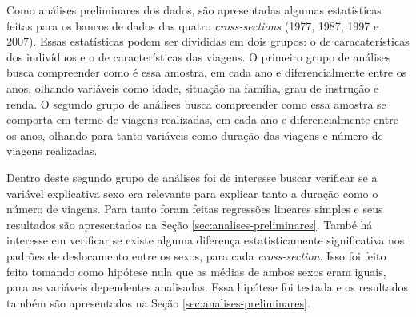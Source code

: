 \begin{quadro}[htb]
\end{quadro}

Como análises preliminares dos dados, são apresentadas algumas estatísticas feitas para os bancos de dados das quatro \emph{cross-sections} (1977, 1987, 1997 e 2007). Essas estatísticas podem ser divididas em dois grupos: o de caracaterísticas dos indivíduos e o de características das viagens. O primeiro grupo de análises busca compreender como é essa amostra, em cada ano e diferencialmente entre os anos, olhando variáveis como idade, situação na família, grau de instrução e renda. O segundo grupo de análises busca compreender como essa amostra se comporta em termo de viagens realizadas, em cada ano e diferencialmente entre os anos, olhando para tanto variáveis como duração das viagens e número de viagens realizadas.

Dentro deste segundo grupo de análises foi de interesse buscar verificar se a variável explicativa sexo era relevante para explicar tanto a duração como o número de viagens. Para tanto foram feitas regressões lineares simples e seus resultados são apresentados na Seção \ref{sec:analises-preliminares}. També há interesse em verificar se existe alguma diferença estatisticamente significativa nos padrões de deslocamento entre os sexos, para cada \emph{cross-section}. Isso foi feito feito tomando como hipótese nula que as médias de ambos sexos eram iguais, para as variáveis dependentes analisadas. Essa hipótese foi testada e os resultados também são apresentados na Seção \ref{sec:analises-preliminares}.

